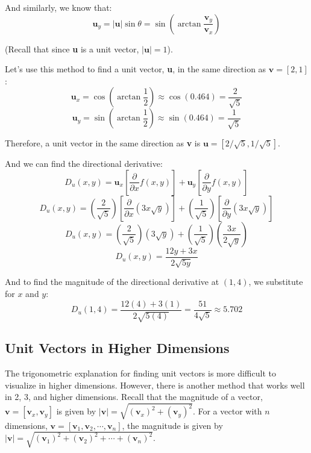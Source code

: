 And similarly, we know that:
$$\textbf{u}_y = |\textbf{u}| \sin{ \theta} = \sin{ \left( \arctan{ \frac{
\textbf{v}_y}{\textbf{v}_x}} \right)}$$

(Recall that since \textbf{u} is a unit vector, $|\textbf{u}| = 1$). 

Let's use this method to find a unit vector, \textbf{u}, in the same direction 
as $\textbf{v} = \left[ 2, 1 \right]$:
$$\textbf{u}_x = \cos{ \left( \arctan{ \frac{1}{2} } \right) } \approx \cos{ 
\left( 0.464 \right) } = \frac{2}{\sqrt{5}}$$
$$\textbf{u}_y = \sin{ \left( \arctan{ \frac{1}{2} } \right) } \approx \sin{ 
\left( 0.464 \right)} = \frac{1}{\sqrt{5}}$$

Therefore, a unit vector in the same direction as \textbf{v} is $\textbf{u} = 
\left[ 2/\sqrt{5}, 1/\sqrt{5} \right]$. 

And we can find the directional derivative:
$$D_u(x, y) = \textbf{u}_x \left[ \frac{\partial}{\partial x} f(x, y) \right] 
+ \textbf{u}_y \left[ \frac{\partial}{\partial y} f(x, y) \right]$$
$$D_u(x, y) = \left( \frac{2}{\sqrt{5}} \right) \left[ \frac{\partial}{
\partial x} \left( 3x\sqrt{y} \right) \right] + \left( \frac{1}{\sqrt{5}} 
\right) \left[ \frac{\partial}{\partial y} \left( 3x\sqrt{y} \right) \right]$$
$$D_u(x, y) = \left( \frac{2}{\sqrt{5}} \right) \left( 3\sqrt{y} \right) + 
\left( \frac{1}{\sqrt{5}} \right) \left( \frac{3x}{2\sqrt{y}} \right)$$
$$D_u(x, y) = \frac{12y + 3x}{2\sqrt{5y}}$$

And to find the magnitude of the directional derivative at $(1, 4)$, we 
substitute for $x$ and $y$:
$$D_u(1, 4) = \frac{12(4) + 3(1)}{2\sqrt{5(4)}} = \frac{51}{4\sqrt{5}} 
\approx 5.702$$

\subsection{Unit Vectors in Higher Dimensions}
The trigonometric explanation for finding unit vectors is more difficult to visualize in higher dimensions. However, there is another method that works well in 2, 3, and higher dimensions. Recall that the magnitude of a vector, $\textbf{v} = \left[ \textbf{v}_x, \textbf{v}_y \right]$ is given by $| \textbf{v} | = \sqrt{\left( \textbf{v}_x \right)^2 + \left( \textbf{v}_y \right)^2}$. For a vector with $n$ dimensions, $\textbf{v} = \left[ \textbf{v}_1, \textbf{v}_2, \cdots , \textbf{v}_n \right]$, the magnitude is given by $| \textbf{v} | = \sqrt{ \left( \textbf{v}_1 \right)^2 + \left( \textbf{v}_2 \right)^2 + \cdots + \left( \textbf{v}_n \right)^2}$. 


